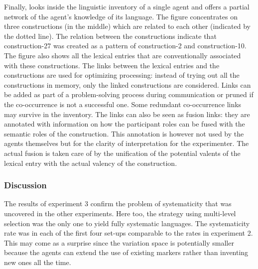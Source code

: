 Finally,  looks inside the linguistic inventory of a single agent and offers a partial network of the agent's knowledge of its language. The figure concentrates on three constructions (in the middle) which are related to each other (indicated by the dotted line). The relation between the constructions indicate that construction-27 was created as a pattern of construction-2 and construction-10. The figure also shows all the lexical entries that are conventionally associated with these constructions. The links between the lexical entries and the constructions are used for optimizing processing: instead of trying out all the constructions in memory, only the linked constructions are considered. Links can be added as part of a problem-solving process during communication or pruned if the co-occurrence is not a successful one. Some redundant co-occurrence links may survive in the inventory. The links can also be seen as fusion links: they are annotated with information on how the participant roles can be fused with the semantic roles of the construction. This annotation is however not used by the agents themselves but for the clarity of interpretation for the experimenter. The actual fusion is taken care of by the unification of the potential valents of the lexical entry with the actual valency of the construction.


\subsubsection{Discussion}
 The results of experiment 3 confirm the problem of systematicity that was uncovered in the other experiments. Here too, the strategy using multi-level selection was the only one to yield fully systematic languages. The systematicity rate was in each of the first four set-ups comparable to the rates in experiment 2. This may come as a surprise since the variation space is potentially smaller because the agents can extend the use of existing markers rather than inventing new ones all the time.

